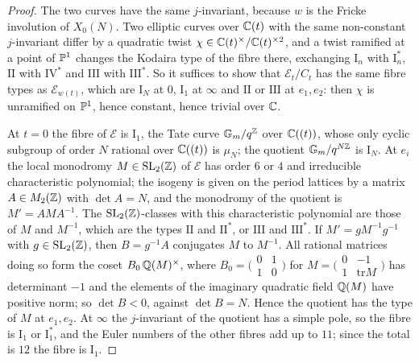 \begin{proof}
The two curves have the same $j$-invariant, because $w$ is the Fricke involution of $X_{0}(N)$. Two elliptic curves over $\mathbb{C}(t)$ with the same non-constant $j$-invariant differ by a quadratic twist $\chi\in\mathbb{C}(t)^{\times}/\mathbb{C}(t)^{\times2}$, and a twist ramified at a point of $\mathbb{P}^{1}$ changes the Kodaira type of the fibre there, exchanging $\mathrm{I}_{n}$ with $\mathrm{I}_{n}^{*}$, $\mathrm{II}$ with $\mathrm{IV}^{*}$ and $\mathrm{III}$ with $\mathrm{III}^{*}$. So it suffices to show that $\mathcal{E}_{t}/C_{t}$ has the same fibre types as $\mathcal{E}_{w(t)}$, which are $\mathrm{I}_{N}$ at $0$, $\mathrm{I}_{1}$ at $\infty$ and $\mathrm{II}$ or $\mathrm{III}$ at $e_{1},e_{2}$: then $\chi$ is unramified on $\mathbb{P}^{1}$, hence constant, hence trivial over $\mathbb{C}$.

At $t=0$ the fibre of $\mathcal{E}$ is $\mathrm{I}_{1}$, the Tate curve $\mathbb{G}_{m}/q^{\mathbb{Z}}$ over $\mathbb{C}((t))$, whose only cyclic subgroup of order $N$ rational over $\mathbb{C}((t))$ is $\mu_{N}$; the quotient $\mathbb{G}_{m}/q^{N\mathbb{Z}}$ is $\mathrm{I}_{N}$. At $e_{i}$ the local monodromy $M\in\mathrm{SL}_{2}(\mathbb{Z})$ of $\mathcal{E}$ has order $6$ or $4$ and irreducible characteristic polynomial; the isogeny is given on the period lattices by a matrix $A\in M_{2}(\mathbb{Z})$ with $\det A=N$, and the monodromy of the quotient is $M'=AMA^{-1}$. The $\mathrm{SL}_{2}(\mathbb{Z})$-classes with this characteristic polynomial are those of $M$ and $M^{-1}$, which are the types $\mathrm{II}$ and $\mathrm{II}^{*}$, or $\mathrm{III}$ and $\mathrm{III}^{*}$. If $M'=gM^{-1}g^{-1}$ with $g\in\mathrm{SL}_{2}(\mathbb{Z})$, then $B=g^{-1}A$ conjugates $M$ to $M^{-1}$. All rational matrices doing so form the coset $B_{0}\,\mathbb{Q}(M)^{\times}$, where $B_{0}=\bigl(\begin{smallmatrix}0&1\\1&0\end{smallmatrix}\bigr)$ for $M=\bigl(\begin{smallmatrix}0&-1\\1&\mathrm{tr}M\end{smallmatrix}\bigr)$ has determinant $-1$ and the elements of the imaginary quadratic field $\mathbb{Q}(M)$ have positive norm; so $\det B<0$, against $\det B=N$. Hence the quotient has the type of $M$ at $e_{1},e_{2}$. At $\infty$ the $j$-invariant of the quotient has a simple pole, so the fibre is $\mathrm{I}_{1}$ or $\mathrm{I}_{1}^{*}$, and the Euler numbers of the other fibres add up to $11$; since the total is $12$ the fibre is $\mathrm{I}_{1}$.
\end{proof}

